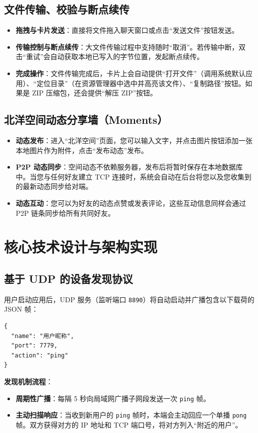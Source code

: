 \documentclass[UTF8]{ctexart}
\begin{document}
\subsection{文件传输、校验与断点续传}
\begin{itemize}
    \item \textbf{拖拽与卡片发送}：直接将文件拖入聊天窗口或点击“发送文件”按钮发送。
    \item \textbf{传输控制与断点续传}：大文件传输过程中支持随时“取消”。若传输中断，双击“重试”会自动获取本地已写入的字节位置，发起断点续传。
    \item \textbf{完成操作}：文件传输完成后，卡片上会自动提供“打开文件”（调用系统默认应用）、“定位目录”（在资源管理器中选中并高亮该文件）、“复制路径”按钮。如果是 ZIP 压缩包，还会提供“解压 ZIP”按钮。
\end{itemize}

\subsection{北洋空间动态分享墙（Moments）}
\begin{itemize}
    \item \textbf{动态发布}：进入“北洋空间”页面，您可以输入文字，并点击图片按钮添加一张本地图片作为附件，点击“发布动态”发布。
    \item \textbf{P2P 动态同步}：空间动态不依赖服务器，发布后将暂时保存在本地数据库中。当您与任何好友建立 TCP 连接时，系统会自动在后台将您以及您收集到的最新动态同步给对端。
    \item \textbf{动态互动}：您可以为好友的动态点赞或发表评论，这些互动信息同样会通过 P2P 链条同步给所有共同好友。
\end{itemize}

\section{核心技术设计与架构实现}

\subsection{基于 UDP 的设备发现协议}
用户启动应用后，UDP 服务（监听端口 \texttt{8890}）将自动启动并广播包含以下载荷的 JSON 帧：
\begin{lstlisting}
{
  "name": "用户昵称",
  "port": 7779,
  "action": "ping"
}
\end{lstlisting}
\textbf{发现机制流程}：
\begin{itemize}
    \item \textbf{周期性广播}：每隔 5 秒向局域网广播子网段发送一次 \texttt{ping} 帧。
    \item \textbf{主动扫描响应}：当收到新用户的 \texttt{ping} 帧时，本端会主动回应一个单播 \texttt{pong} 帧。双方获得对方的 IP 地址和 TCP 端口号，将对方列入“附近的用户”。
\end{itemize}
\end{document}
